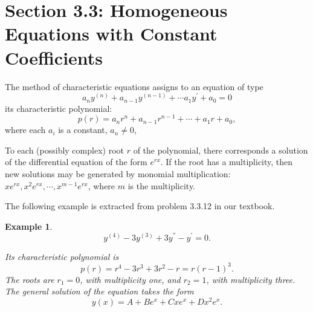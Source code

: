 \documentclass[11pt]{amsart}
\newtheorem{example}{Example}
\numberwithin{equation}{section}
\begin{document}
\section*{Section 3.3: Homogeneous Equations with Constant Coefficients}

The method of characteristic equations assigns to an equation of type 
\begin{equation*}
    a_ny^{(n)}+a_{n-1}y^{(n-1)} + \cdots a_1y^{'}+a_0 = 0
\end{equation*}
its characteristic polynomial:
\begin{equation*}
    p(r)= a_nr^n+a_{n-1}r^{n-1}+\cdots +a_1r + a_0,
\end{equation*}
where each $a_i$ is a constant, $a_n \neq 0$,

To each (possibly complex) root $r$ of the polynomial, there corresponds a solution of the differential equation of the form $e^{rx}$. If the root has a multiplicity, then new solutions may be generated by monomial multiplication: $xe^{rx}, x^2e^{rx}, \cdots, x^{m-1}e^{rx}$, where $m$ is the multiplicity. 

The following example is extracted from problem 3.3.12 in our textbook.
\begin{example}
\begin{equation*}
    y^{(4)}-3y^{(3)}+3y^{''}-y^{'}=0.
\end{equation*}

Its characteristic polynomial is 
\begin{equation*}
     p(r)  = r^4-3r^3+3r^2-r = r(r-1)^3.
\end{equation*}
 The roots are $r_1=0$, with multiplicity one, and $r_2=1$, with multiplicity three.  The general solution of the equation takes the form
 \begin{equation*}
     y(x)=A + Be^x+Cxe^x+Dx^2e^x.
 \end{equation*}
\end{example}
\end{document}
